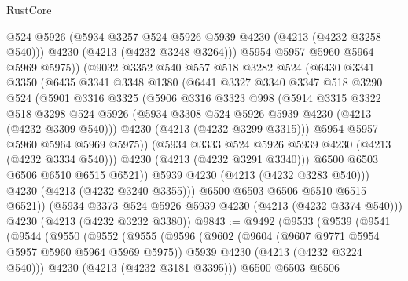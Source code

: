 \begin{lexlean}{RustCore}
\begin{coremodule}
                @524
                @5926
                (@5934 @3257 @524 @5926 @5939 @4230 (@4213 (@4232 @3258 @540)))
                @4230
                (@4213 (@4232 @3248 @3264)))
              @5954
              @5957
              @5960
              @5964
              @5969
              @5975))
          (@9032
            @3352
            @540
            @557
            @518
            @3282
            @524
            (@6430
              @3341
              @3350
              (@6435
                @3341
                @3348
                @1380
                (@6441
                  @3327
                  @3340
                  @3347
                  @518
                  @3290
                  @524
                  (@5901
                    @3316
                    @3325
                    (@5906
                      @3316
                      @3323
                      @998
                      (@5914
                        @3315
                        @3322
                        @518
                        @3298
                        @524
                        @5926
                        (@5934 @3308 @524 @5926 @5939 @4230 (@4213 (@4232 @3309 @540)))
                        @4230
                        (@4213 (@4232 @3299 @3315)))
                      @5954
                      @5957
                      @5960
                      @5964
                      @5969
                      @5975))
                  (@5934 @3333 @524 @5926 @5939 @4230 (@4213 (@4232 @3334 @540)))
                  @4230
                  (@4213 (@4232 @3291 @3340)))
                @6500
                @6503
                @6506
                @6510
                @6515
                @6521))
            @5939
            @4230
            (@4213 (@4232 @3283 @540)))
          @4230
          (@4213 (@4232 @3240 @3355)))
        @6500
        @6503
        @6506
        @6510
        @6515
        @6521))
    (@5934 @3373 @524 @5926 @5939 @4230 (@4213 (@4232 @3374 @540)))
    @4230
    (@4213 (@4232 @3232 @3380))
@9843 := @9492
    (@9533
      (@9539
        (@9541
          (@9544
            (@9550
              (@9552
                (@9555
                  (@9596
                    (@9602
                      (@9604 (@9607 @9771 @5954 @5957 @5960 @5964 @5969 @5975))
                      @5939
                      @4230
                      (@4213 (@4232 @3224 @540)))
                    @4230
                    (@4213 (@4232 @3181 @3395)))
                  @6500
                  @6503
                  @6506

\end{coremodule}
\end{lexlean}
